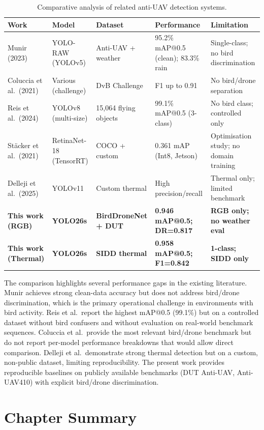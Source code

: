 \documentclass[12pt,a4paper]{report}
\renewcommand{\arraystretch}{1.1}
\begin{document}
\begin{table}[H]
\centering
\caption[Comparative analysis of anti-UAV systems]{Comparative analysis of related anti-UAV detection systems.}
\label{tab:lit_compare}
\footnotesize
\renewcommand{\arraystretch}{0.85}
\begin{tabular}{|p{}|p{}|p{}|p{}|p{}|}
\hline
\rowcolor{gray!20}
\textbf{Work} & \textbf{Model} & \textbf{Dataset} & \textbf{Performance} & \textbf{Limitation} \\
\hline
Munir (2023) & YOLO-RAW (YOLOv5) & Anti-UAV + weather & 95.2\% mAP@0.5 (clean); 83.3\% rain & Single-class; no bird discrimination \\
\hline
Coluccia et al.\ (2021) & Various (challenge) & DvB Challenge & F1 up to 0.91 & No bird/drone separation \\
\hline
Reis et al.\ (2024) & YOLOv8 (multi-size) & 15,064 flying objects & 99.1\% mAP@0.5 (3-class) & No bird class; controlled only \\
\hline
Stäcker et al.\ (2021) & RetinaNet-18 (TensorRT) & COCO + custom & 0.361 mAP (Int8, Jetson) & Optimisation study; no domain training \\
\hline
Delleji et al.\ (2025) & YOLOv11 & Custom thermal & High precision/recall & Thermal only; limited benchmark \\
\hline
\textbf{This work (RGB)} & \textbf{YOLO26s} & \textbf{BirdDroneNet + DUT} & \textbf{0.946 mAP@0.5; DR=0.817} & \textbf{RGB only; no weather eval} \\
\hline
\textbf{This work (Thermal)} & \textbf{YOLO26s} & \textbf{SIDD thermal} & \textbf{0.958 mAP@0.5; F1=0.842} & \textbf{1-class; SIDD only} \\
\hline
\end{tabular}
\end{table}

The comparison highlights several performance gaps in the existing literature.
Munir achieves strong clean-data accuracy but does not address bird/drone
discrimination, which is the primary operational challenge in environments
with bird activity. Reis et al.\ report the highest mAP@0.5 (99.1\%) but
on a controlled dataset without bird confusers and without evaluation on
real-world benchmark sequences. Coluccia et al.\ provide the most relevant
bird/drone benchmark but do not report per-model performance breakdowns
that would allow direct comparison. Delleji et al.\ demonstrate strong
thermal detection but on a custom, non-public dataset, limiting reproducibility.
The present work provides reproducible baselines on publicly available
benchmarks (DUT Anti-UAV, Anti-UAV410) with explicit bird/drone discrimination.\section{Chapter Summary}
\end{document}
